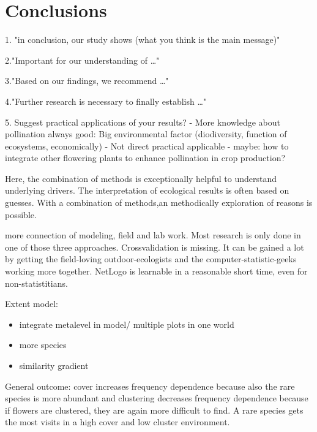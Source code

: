 \section{Conclusions}
\label{ch:conclusions}
1. "in conclusion, our study shows (what you think is the main message)"


2."Important for our understanding of …"


3."Based on our findings, we recommend …"


4."Further research is necessary to finally establish …"


5. Suggest practical applications of your results?
- More knowledge about pollination always good: Big environmental factor (diodiversity, function of ecosystems, economically)
- Not direct practical applicable
- maybe: how to integrate other flowering plants to enhance pollination in crop production?


Here, the combination of methods is exceptionally helpful to understand underlying drivers. The interpretation of ecological results is often based on guesses. With a combination of methods,an methodically exploration of reasons is possible.

more connection of modeling, field and lab work. Most research is only done in one of those three approaches. Crossvalidation is missing. It can be gained a lot by getting the field-loving outdoor-ecologists and the computer-statistic-geeks working more together. NetLogo is learnable in a reasonable short time, even for non-statistitians. 

Extent model:
\begin{itemize}
	\item integrate metalevel in model/ multiple plots in one world
	\item more species
	\item similarity gradient
\end{itemize}


General outcome: cover increases frequency dependence because also the rare species is more abundant and clustering decreases frequency dependence because if flowers are clustered, they are again more difficult to find. A rare species gets the most visits in a high cover and low cluster environment.

